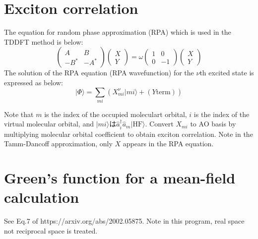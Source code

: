 \documentclass{article}
\begin{document}
\section{Exciton correlation}
The equation for random phase approximation (RPA) which is used in the TDDFT method is below:
\begin{equation}
\begin{pmatrix}
A & B \\
-B^* & -A^*
\end{pmatrix}
\begin{pmatrix}
X \\
Y
\end{pmatrix}
= \omega
\begin{pmatrix}
1 & 0 \\
0 & -1
\end{pmatrix}
\begin{pmatrix}
X \\
Y
\end{pmatrix}
\end{equation}
The solution of the RPA equation (RPA wavefunction) for the $\nu$th excited state is expressed as below:
\begin{equation}
|\Phi \rangle = \sum_{mi} (X^{\nu}_{mi}|mi\rangle + (Y \mathrm{term}))
\end{equation}

Note that $m$ is the index of the occupied moleculart orbital, $i$ is the index of the virtual molecular orbital,
and $|mi\rangle$は$\hat{a}^{\dagger}_{i}\hat{a}_{m}|\mathrm{HF}\rangle$.
Convert $X_{mi}$ to AO basis by multiplying molecular orbital coefficient to obtain exciton correlation.
Note in the Tamm-Dancoff approximation, only $X$ appears in the RPA equation.

\section{Green's function for a mean-field calculation}
 See Eq.7 of https://arxiv.org/abs/2002.05875.
 Note in this program, real space not reciprocal space is treated.
\end{document}

